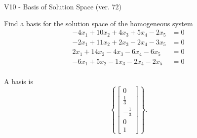 \begin{exercise}
  \begin{exerciseTitle}V10 - Basis of Solution Space (ver. 72)\end{exerciseTitle}
  \begin{exerciseStatement}
    Find a basis for the solution space of the homogeneous system 
\begin{align*}
 -4 x_ 1 + 10 x_ 2 + 4 x_ 3 + 5 x_ 4 -2 x_ 5 &= 0  \\ 
  -2 x_ 1 + 11 x_ 2 + 2 x_ 3 -2 x_ 4 -3 x_ 5 &= 0  \\ 
  2 x_ 1 + 14 x_ 2 -4 x_ 3 -6 x_ 4 -6 x_ 5 &= 0  \\ 
  -6 x_ 1 + 5 x_ 2 -1 x_ 3 -2 x_ 4 -2 x_ 5 &= 0  \\ 
 \end{align*}


 
  \end{exerciseStatement}

  \begin{exerciseAnswer}
   A basis is   
\[\left\{\left[\begin{array}{c}
0 \\
\frac{1}{3} \\
-\frac{1}{3} \\
0 \\
1
\end{array}\right]\right\}.\]

  


  \end{exerciseAnswer}
\end{exercise}